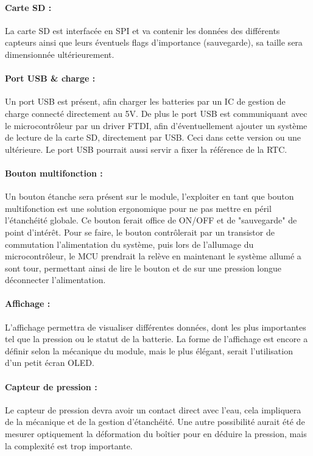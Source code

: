 {\paragraph{Carte SD :}
La carte SD est interfacée en SPI et va contenir les données des différents capteurs ainsi que leurs éventuels flags d'importance (sauvegarde), sa taille sera dimensionnée ultérieurement.

\paragraph{Port USB \& charge :}
Un port USB est présent, afin charger les batteries par un IC de gestion de charge connecté directement au 5V. De plus le port USB est communiquant avec le microcontrôleur par un driver FTDI, afin d'éventuellement ajouter un système de lecture de la carte SD, directement par USB. Ceci dans cette version ou une ultérieure. Le port USB pourrait aussi servir a fixer la référence de la RTC. 

\paragraph{Bouton multifonction :}
Un bouton étanche sera présent sur le module, l'exploiter en tant que bouton multifonction est une solution ergonomique pour ne pas mettre en péril l'étanchéité globale. Ce bouton ferait office de ON/OFF et de "sauvegarde" de point d'intérêt. Pour se faire, le bouton contrôlerait par un transistor de commutation l'alimentation du système, puis lors de l'allumage du microcontrôleur, le MCU prendrait la relève en maintenant le système allumé a sont tour, permettant ainsi de lire le bouton et de sur une pression longue déconnecter l'alimentation.

\paragraph{Affichage :}
L'affichage permettra de visualiser différentes données, dont les plus importantes tel que la pression ou le statut de la batterie. La forme de l'affichage est encore a définir selon la mécanique du module, mais le plus élégant, serait l'utilisation d'un petit écran OLED.

\paragraph{Capteur de pression :}
Le capteur de pression devra avoir un contact direct avec l'eau, cela impliquera de la mécanique et de la gestion d'étanchéité. Une autre possibilité aurait été de mesurer optiquement la déformation du boîtier pour en déduire la pression, mais la complexité est trop importante.
}

